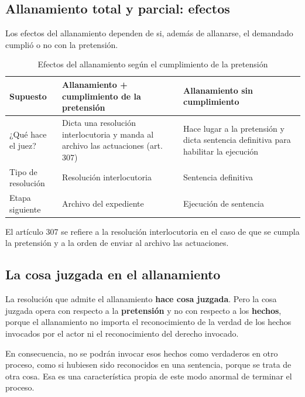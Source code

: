 \documentclass[12pt,oneside]{book}
\begin{document}
\subsection{Allanamiento total y parcial: efectos}

Los efectos del allanamiento dependen de si, además de allanarse, el demandado cumplió o no con la pretensión.

\begin{table}[H]
\centering
\caption{Efectos del allanamiento según el cumplimiento de la pretensión}
\small
\begin{tabularx}{\textwidth}{
    >{\raggedright\arraybackslash}p{}
    >{\raggedright\arraybackslash}X
    >{\raggedright\arraybackslash}X
}
\toprule
\textbf{Supuesto} & \textbf{Allanamiento + cumplimiento de la pretensión} & \textbf{Allanamiento sin cumplimiento} \\
\midrule
¿Qué hace el juez? & Dicta una resolución interlocutoria y manda al archivo las actuaciones (art. 307) & Hace lugar a la pretensión y dicta sentencia definitiva para habilitar la ejecución \\
Tipo de resolución & Resolución interlocutoria & Sentencia definitiva \\
Etapa siguiente & Archivo del expediente & Ejecución de sentencia \\
\bottomrule
\end{tabularx}
\end{table}

El artículo 307 se refiere a la resolución interlocutoria en el caso de que se cumpla la pretensión y a la orden de enviar al archivo las actuaciones.

\subsection{La cosa juzgada en el allanamiento}

La resolución que admite el allanamiento \textbf{hace cosa juzgada}. Pero la cosa juzgada opera con respecto a la \textbf{pretensión} y no con respecto a los \textbf{hechos}, porque el allanamiento no importa el reconocimiento de la verdad de los hechos invocados por el actor ni el reconocimiento del derecho invocado.

En consecuencia, no se podrán invocar esos hechos como verdaderos en otro proceso, como si hubiesen sido reconocidos en una sentencia, porque se trata de otra cosa. Esa es una característica propia de este modo anormal de terminar el proceso.
\end{document}
